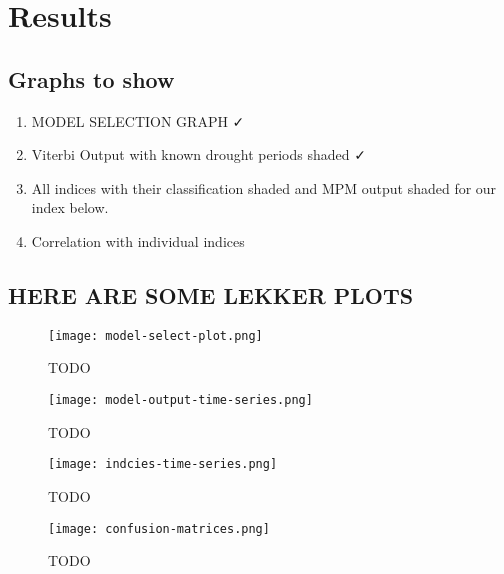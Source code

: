 \graphicspath{{results/fig/}}

\chapter{Results}
\label{chap:results}

\section{Graphs to show}

\begin{enumerate}
    \item MODEL SELECTION GRAPH ✓
    \item Viterbi Output with known drought periods shaded ✓
    \item All indices with their classification shaded and MPM output shaded for our index below.
    \item Correlation with individual indices
\end{enumerate}

\section{HERE ARE SOME LEKKER PLOTS}

\begin{figure}[!h]
    \centering
    \texttt{[image: model-select-plot.png]}
    \caption[TODO]{TODO}
    \label{fig:model-select-plot}
\end{figure}


\begin{figure}[!h]
    \centering
    \texttt{[image: model-output-time-series.png]}
    \caption[TODO]{TODO}
    \label{fig:model-output-time-series}
\end{figure}


\begin{figure}[!h]
    \centering
    \texttt{[image: indcies-time-series.png]}
    \caption[TODO]{TODO}
    \label{fig:indcies-time-series}
\end{figure}



\begin{figure}[!h]
    \centering
    \texttt{[image: confusion-matrices.png]}
    \caption[TODO]{TODO}
    \label{fig:confusion-matrices}
\end{figure}


